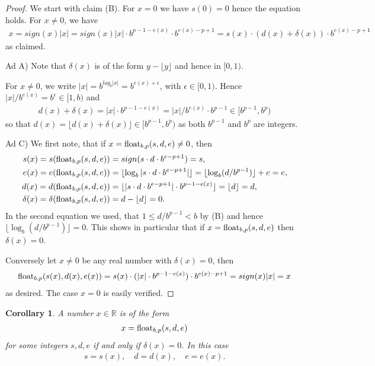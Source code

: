\documentclass{article}
\theoremstyle{plain}
\newtheorem{corollary}[definition]{Corollary}
\newcommand{\IR}{\mathbb{R}}
\newcommand{\floor}[1]{\lfloor#1\rfloor}
\newcommand{\abs}[1]{|#1|}
\newcommand{\eps}{\epsilon}
\begin{document}
\begin{proof}
  We start with claim (B). For $x=0$ we have $s(0) = 0$ hence the equation holds.
  For $x \neq 0$, we have
  \begin{align*}
    x = sign(x) |x| = sign(x) \abs{x} \cdot b^{p-1-e(x)} \cdot b^{e(x)-p+1} = s(x) \cdot (d(x) + \delta(x)) \cdot b^{e(x)-p+1}
  \end{align*}
  as claimed.

  Ad A) Note that $\delta(x)$ is of the form $y - \floor{y}$ and hence in $[0,1)$.

    For $x \neq 0$, we write $|x| = b^{log_b|x|} = b^{e(x) + \eps}$, with $\eps \in [0,1)$.
  Hence $\abs{x} / b^{e(x)} = b^\eps \in [1,b)$ and
  \begin{align*}
     d(x) + \delta(x) = \abs{x} \cdot b^{p-1-e(x)} = \abs{x} / b^{e(x)} \cdot b^{p-1} \in [b^{p-1},b^p)
  \end{align*}
  so that
  $d(x) = \floor{d(x) + \delta(x)} \in [ b^{p-1}, b^p )$
  as both $b^{p-1}$ and $b^p$ are integers.

  Ad C) We first note, that if $x = \mathrm{float}_{b,p}(s,d,e) \neq 0$, then
  \begin{align*}
    s(x) = s(\float_{b,p}(s,d,e)) &= sign(s \cdot d \cdot b^{e-p+1}) = s, \\
    e(x) = e(\float_{b,p}(s,d,e))    &= \floor{ \log_b \abs{s \cdot d \cdot b^{e-p+1}} } = \floor{\log_b(d/b^{p-1})} + e = e, \\
    d(x) = d(\float_{b,p}(s,d,e))    &= \floor{\abs{ s \cdot d \cdot b^{e-p+1} } \cdot b^{p-1-e(x)}} = \floor{d} = d, \\
    \delta(x) = \delta(\float_{b,p}(s,d,e)) &= d - \floor{d} = 0.
  \end{align*}
  In the second equation we used, that $1 \leq d/b^{p-1} < b$ by (B) and hence $\floor{\log_b(d / b^{p-1})} = 0$.
  This shows in particular that if $x = \mathrm{float}_{b,p}(s,d,e)$ then $\delta(x) = 0$.

  Conversely let $x \neq 0$ be any real number with $\delta(x) = 0$, then
  \begin{align*}
    \float_{b,p}(s(x),d(x),e(x)) = s(x) \cdot (\abs{x} \cdot b^{p-1-e(x)}) \cdot b^{e(x)-p+1} = sign(x) \abs{x} = x
  \end{align*}
  as desired.
  The case $x=0$ is easily verified.
\end{proof}

\begin{corollary}
  A number $x \in \IR$ is of the form
  \begin{align*}
    x = \mathrm{float}_{b,p}(s,d,e)
  \end{align*}
  for some integers $s,d,e$ if and only if $\delta(x) = 0$.
  In this case
  \begin{align*}
    s = s(x), \quad d = d(x), \quad e = e(x).
  \end{align*}
\end{corollary}
\end{document}
